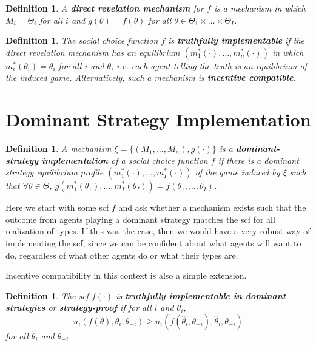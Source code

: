 \documentclass[letter, 10pt]{article}
\newtheorem{definition}[theorem]{Definition}
\theoremstyle{definition}
\begin{document}
\begin{spacing}{1.1}
\begin{definition}
  A \textbf{direct revelation mechanism} for $f$ is a mechanism
  in which $M_i = \Theta_i$ for all $i$ and $g(\theta) =
  f(\theta)$ for all $\theta \in \Theta_1 \times \ldots
  \times \Theta_I$.
\end{definition}

\begin{definition}
  The social choice function $f$ is \textbf{truthfully
    implementable} if the direct revelation mechanism has
  an equilibrium $(m_1^*(\cdot), \ldots, m_n^*(\cdot))$
  in which $m_i^*(\theta_i) = \theta_i$ for all $i$ and
  $\theta$, i.e. each agent telling the truth is an
  equilibrium of the induced game. Alternatively, such a
  mechanism is \textbf{incentive compatible}.
\end{definition}

\section{Dominant Strategy Implementation}
\label{sec:domin-strat-impl}

\begin{definition}
  A mechanism $\xi = \{(M_1, \ldots, M_n),
  g(\cdot)\}$ is a \textbf{dominant-strategy
    implementation} of a social choice function $f$ if
  there is a dominant strategy equilibrium profile
  $(m_1^*(\cdot), \ldots, m_I^*(\cdot))$ of the game
  induced by $\xi$ such that $\forall \theta \in \Theta$,
  $g(m_1^*(\theta_1), \ldots, m_I^*(\theta_I)) =
  f(\theta_1, \ldots, \theta_I)$.
\end{definition}

Here we start with some scf $f$ and ask whether a mechanism exists such
that the outcome from agents playing a dominant strategy matches the scf
for all realization of types. If this was the case, then we would have a
very robust way of implementing the scf, since we can be confident about
what agents will want to do, regardless of what other agents do or what their types are.

Incentive compatibility in this context is also a simple
extension.
\begin{definition}\label{IC}
  The scf $f(\cdot)$ is \textbf{truthfully implementable in dominant
  strategies} or \textbf{strategy-proof} if for all $i$ and $\theta_i$, \[u_i(f(\theta),\theta_i, \theta_{-i})
  \geq u_i(f(\hat{\theta}_i, \theta_{-i}),
  \hat{\theta}_i, \theta_{-i})\] for all $\hat{\theta}_i$
  and $\theta_{-i}$.
\end{definition}


\end{spacing}
\end{document}
